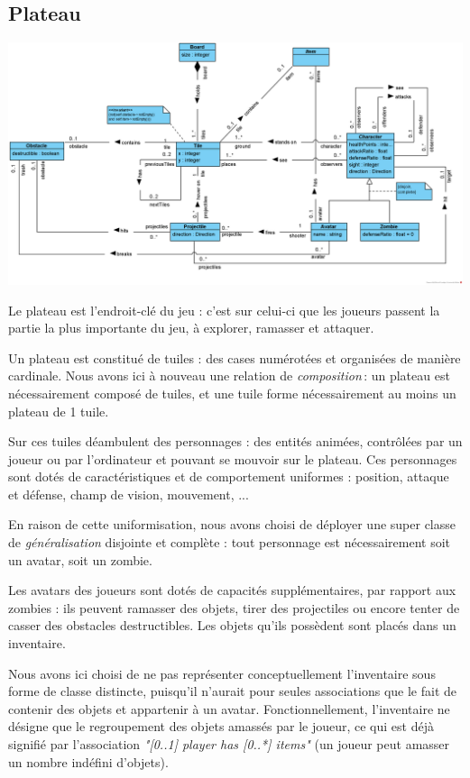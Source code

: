 \documentclass[oneside,a4paper]{book}
\begin{document}
\subsection{Plateau}
\includegraphics[width=\textwidth,height=\textheight,keepaspectratio]{Diagrams/DJ-Board.png}\newline

Le plateau est l'endroit-clé du jeu : c'est sur celui-ci que les joueurs passent la partie la plus importante du jeu, à explorer, ramasser et attaquer.\newline

Un plateau est constitué de tuiles : des cases numérotées et organisées de manière cardinale. Nous avons ici à nouveau une relation de \textit{composition}\,: un plateau est nécessairement composé de tuiles, et une tuile forme nécessairement au moins un plateau de 1 tuile. \newline

Sur ces tuiles déambulent des personnages : des entités animées, contrôlées par un joueur ou par l'ordinateur et pouvant se mouvoir sur le plateau. Ces personnages sont dotés de caractéristiques et de comportement uniformes : position, attaque et défense, champ de vision, mouvement, ...

En raison de cette uniformisation, nous avons choisi de déployer une super classe de \textit{généralisation} disjointe et complète : tout personnage est nécessairement soit un avatar, soit un zombie. \newline

Les avatars des joueurs sont dotés de capacités supplémentaires, par rapport aux zombies : ils peuvent ramasser des objets, tirer des projectiles ou encore tenter de casser des obstacles destructibles. Les objets qu'ils possèdent sont placés dans un inventaire.\newline
\begin{tcolorbox}
    Nous avons ici choisi de ne pas représenter conceptuellement l'inventaire sous forme de classe distincte, puisqu'il n'aurait pour seules associations que le fait de contenir des objets et appartenir à un avatar. Fonctionnellement, l'inventaire ne désigne que le regroupement des objets amassés par le joueur, ce qui est déjà signifié par l'association \textit{"{[}0..1{]} player has {[}0..*{]} items"} (un joueur peut amasser un nombre indéfini d'objets).
\end{tcolorbox}
\end{document}
